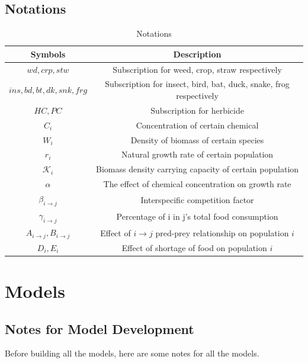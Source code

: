\documentclass{HZNUMCM}
\begin{document}
        \subsection{Notations}
      \begin{table}[H]
        \centering
        \caption{Notations}
        \begin{tabular}{cc}
          \toprule
          \rowcolor{customcolor!40} %
          Symbols & Description\\
          \midrule
          $wd, crp , stw$ & Subscription for weed, crop, straw respectively \\
          $ins, bd, bt, dk, snk, frg$ & Subscription for insect, bird, bat, duck, snake, frog respectively\\
          $HC, PC$ & Subscription for herbicide \\
          $C_i$ & Concentration of certain chemical \\
          $W_i$ & Density of biomass of certain species \\
          $r_i$ & Natural growth rate of certain population\\
          $\mathscr{K}_i$ & Biomass density carrying capacity of certain population\\
          $\alpha$ & The effect of chemical concentration on growth rate\\
          $\beta_{i \rightarrow j}$ & Interspecific competition factor\\
          $\gamma_{i \rightarrow j}$ & Percentage of i in j's total food consumption\\
          $A_{i\rightarrow j},B_{i\rightarrow j}$ & Effect of $i\rightarrow j$ pred-prey relationship on population $i$ \\
          $D_i,E_i$ & Effect of shortage of food on population $i$ \\
          \bottomrule
        \end{tabular}
        \label{tab:Notations}
      \end{table}
  \section{Models}
    \subsection{Notes for Model Development}
        Before building all the models, here are some notes for all the models.
        
\end{document}
